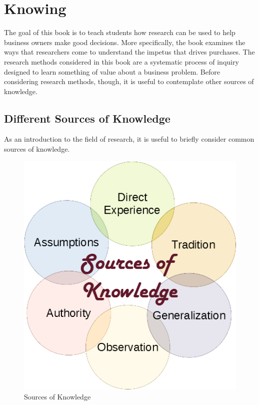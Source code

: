 \section{Knowing}
The goal of this book is to teach students how research can be used to help business owners make good decisions. More specifically, the book examines the ways that researchers come to understand the impetus that drives purchases. The research methods considered in this book are a systematic process of inquiry designed to learn something of value about a business problem. Before considering research methods, though, it is useful to contemplate other sources of knowledge.

\subsection{Different Sources of Knowledge}

As an introduction to the field of research, it is useful to briefly consider common sources of knowledge.

\begin{figure}[H]
	\centering
	\includegraphics[width=\maxwidth{.95\linewidth}]{gfx/01-SourcesOfKnowledge}
	\caption{Sources of Knowledge}
	\label{01:fig02}
\end{figure}

